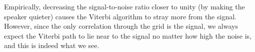 \documentclass[paper-main.tex]{subfiles}
\begin{document}
Empirically, decreasing the signal-to-noise ratio closer to unity (by making the speaker quieter) causes the Viterbi algorithm to stray more from the signal. 
However, since the only correlation through the grid is the signal, we always expect the Viterbi path to lie near to the signal no matter how high the noise is, and this is indeed what we see. 
\end{document}
